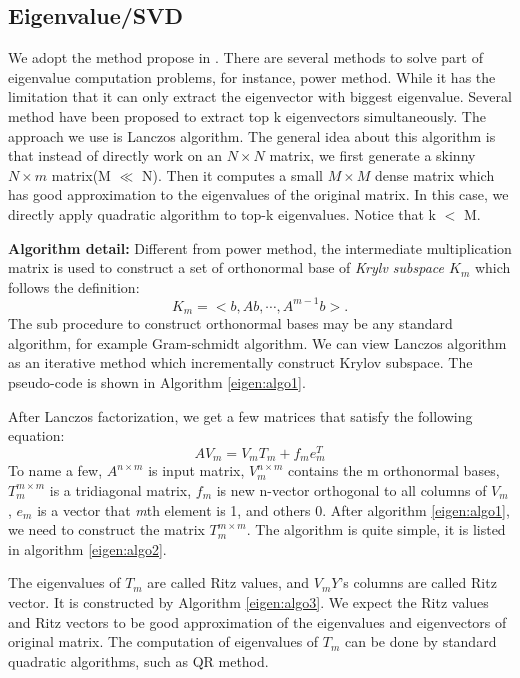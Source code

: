 \subsection{Eigenvalue/SVD}
We adopt the method propose in \cite{kang2011spectral}. There are several methods to solve part of eigenvalue computation problems, for instance, power method\cite{langville2004deeper}. While it has the limitation that it can only extract the eigenvector with biggest eigenvalue. Several method have been proposed to extract top k eigenvectors simultaneously. The approach we use is Lanczos algorithm\cite{lanczos1950iteration}. The general idea about this algorithm is that instead of directly work on an $N \times N$ matrix, we first generate a skinny $N \times m$ matrix(M $\ll$ N). Then it computes a small $M \times M$ dense matrix which has good approximation to the eigenvalues of the original matrix. In this case, we directly apply quadratic algorithm to top-k eigenvalues. Notice that k $<$ M.

{\bf{Algorithm detail:}} Different from power method, the intermediate multiplication matrix is used to construct a set of orthonormal base of \emph{Krylv subspace $K_{m}$} which follows the definition:
\begin{equation}
K_{m} = < b, Ab, \cdots, A^{m-1}b>.
\end{equation}
The sub procedure to construct orthonormal bases may be any standard algorithm, for example Gram-schmidt algorithm. We can view Lanczos algorithm as an iterative method which incrementally construct Krylov subspace. The pseudo-code is shown in Algorithm \ref{eigen:algo1}.

After Lanczos factorization, we get a few matrices that satisfy the following equation:
\begin{equation}
	AV_{m} = V_{m}T_{m} + f_{m}e^{T}_{m}
\end{equation}
To name a few, $A^{n\times m}$ is input matrix, $V^{n\times m}_{m}$ contains the m orthonormal bases, $T^{m\times m}_{m}$ is a tridiagonal matrix, $f_{m}$ is new n-vector orthogonal to all columns of $V_{m}$, $
e_{m}$ is a vector that \emph{m}th element is 1, and others 0. After algorithm \ref{eigen:algo1}, we need to construct the matrix $T^{m\times m}_{m}$. The algorithm is quite simple, it is listed in algorithm \ref{eigen:algo2}. 

The eigenvalues of $T_{m}$ are called Ritz values, and $V_{m}Y$'s columns are called Ritz vector. It is constructed by Algorithm \ref{eigen:algo3}. We expect the Ritz values and Ritz vectors to be good approximation of the eigenvalues and eigenvectors of original matrix. The computation of eigenvalues of $T_{m}$ can be done by standard quadratic algorithms, such as QR method. 

